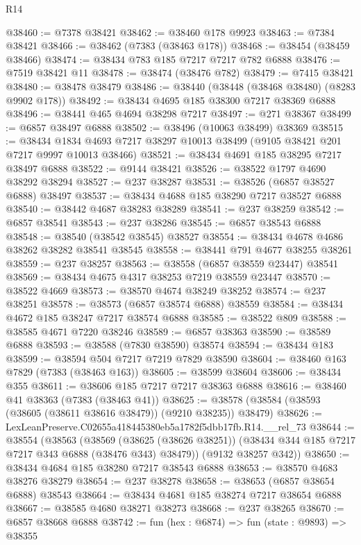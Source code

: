 \begin{lexlean}{R14}
\begin{coremodule}
@38460 := @7378 @38421
@38462 := @38460 @178 @9923
@38463 := @7384 @38421
@38466 := @38462 (@7383 (@38463 @178))
@38468 := @38454 (@38459 @38466)
@38474 := @38434 @783 @185 @7217 @7217 @782 @6888
@38476 := @7519 @38421 @11
@38478 := @38474 (@38476 @782)
@38479 := @7415 @38421
@38480 := @38478 @38479
@38486 := @38440 (@38448 (@38468 @38480) (@8283 @9902 @178))
@38492 := @38434 @4695 @185 @38300 @7217 @38369 @6888
@38496 := @38441 @465 @4694 @38298 @7217
@38497 := @271 @38367
@38499 := @6857 @38497 @6888
@38502 := @38496 (@10063 @38499) @38369
@38515 := @38434
    @1834
    @4693
    @7217
    @38297
    @10013
    @38499
    (@9105 @38421 @201 @7217 @9997 @10013 @38466)
@38521 := @38434 @4691 @185 @38295 @7217 @38497 @6888
@38522 := @9144 @38421
@38526 := @38522 @1797 @4690 @38292 @38294
@38527 := @237 @38287
@38531 := @38526 (@6857 @38527 @6888) @38497
@38537 := @38434 @4688 @185 @38290 @7217 @38527 @6888
@38540 := @38442 @4687 @38283 @38289
@38541 := @237 @38259
@38542 := @6857 @38541
@38543 := @237 @38286
@38545 := @6857 @38543 @6888
@38548 := @38540 (@38542 @38545) @38527
@38554 := @38434 @4678 @4686 @38262 @38282 @38541 @38545
@38558 := @38441 @791 @4677 @38255 @38261
@38559 := @237 @38257
@38563 := @38558 (@6857 @38559 @23447) @38541
@38569 := @38434 @4675 @4317 @38253 @7219 @38559 @23447
@38570 := @38522 @4669
@38573 := @38570 @4674 @38249 @38252
@38574 := @237 @38251
@38578 := @38573 (@6857 @38574 @6888) @38559
@38584 := @38434 @4672 @185 @38247 @7217 @38574 @6888
@38585 := @38522 @809
@38588 := @38585 @4671 @7220 @38246
@38589 := @6857 @38363
@38590 := @38589 @6888
@38593 := @38588 (@7830 @38590) @38574
@38594 := @38434 @183
@38599 := @38594 @504 @7217 @7219 @7829 @38590
@38604 := @38460 @163 @7829 (@7383 (@38463 @163))
@38605 := @38599 @38604
@38606 := @38434 @355
@38611 := @38606 @185 @7217 @7217 @38363 @6888
@38616 := @38460 @41 @38363 (@7383 (@38463 @41))
@38625 := @38578 (@38584 (@38593 (@38605 (@38611 @38616 @38479)) (@9210 @38235)) @38479)
@38626 := LexLeanPreserve.C02655a418445380eb5a1782f5dbb17fb.R14.__rel_73
@38644 := @38554
    (@38563
      (@38569
        (@38625 (@38626 @38251))
        (@38434 @344 @185 @7217 @7217 @343 @6888 (@38476 @343) @38479))
      (@9132 @38257 @342))
@38650 := @38434 @4684 @185 @38280 @7217 @38543 @6888
@38653 := @38570 @4683 @38276 @38279
@38654 := @237 @38278
@38658 := @38653 (@6857 @38654 @6888) @38543
@38664 := @38434 @4681 @185 @38274 @7217 @38654 @6888
@38667 := @38585 @4680 @38271 @38273
@38668 := @237 @38265
@38670 := @6857 @38668 @6888
@38742 := fun (hex : @6874) =>
  fun (state : @9893) =>
  @38355

\end{coremodule}
\end{lexlean}
